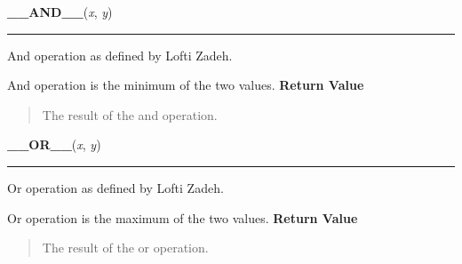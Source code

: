     \vspace{0.5ex}

\hspace{.8\funcindent}\begin{boxedminipage}{\funcwidth}

    \raggedright \textbf{\_\_AND\_\_}(\textit{x}, \textit{y})

    \vspace{-1.5ex}

    \rule{\textwidth}{0.5\fboxrule}
\setlength{\parskip}{2ex}

And operation as defined by Lofti Zadeh.

And operation is the minimum of the two values.
\setlength{\parskip}{1ex}
      \textbf{Return Value}
    \vspace{-1ex}

      \begin{quote}

The result of the and operation.
      \end{quote}

    \end{boxedminipage}

    \label{peach:fuzzy:norms:ZadehOr}

    \vspace{0.5ex}

\hspace{.8\funcindent}\begin{boxedminipage}{\funcwidth}

    \raggedright \textbf{\_\_OR\_\_}(\textit{x}, \textit{y})

    \vspace{-1.5ex}

    \rule{\textwidth}{0.5\fboxrule}
\setlength{\parskip}{2ex}

Or operation as defined by Lofti Zadeh.

Or operation is the maximum of the two values.
\setlength{\parskip}{1ex}
      \textbf{Return Value}
    \vspace{-1ex}

      \begin{quote}

The result of the or operation.
      \end{quote}

    \end{boxedminipage}

